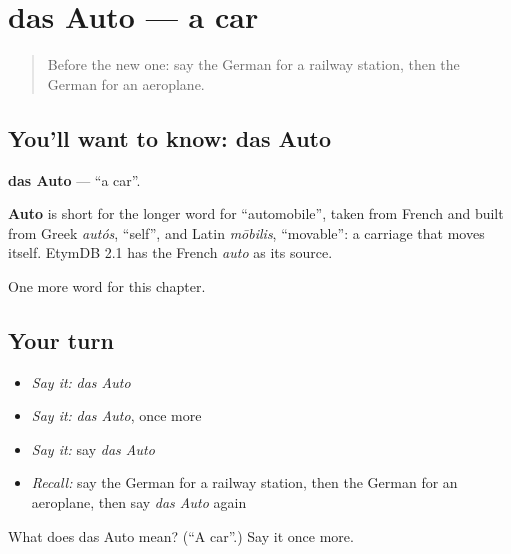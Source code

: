 \section[das Auto]{das Auto — a car}

\label{lesson:GE-C96-auto}



\begin{quote}
Before the new one: say the German for a railway station, then the German for an aeroplane.
\end{quote}

\subsection*{You'll want to know: das Auto}
\textbf{das Auto} — \textquotedblleft{}a car\textquotedblright{}.

\begin{cousinweb}
\textbf{Auto} is short for the longer word for \textquotedblleft{}automobile\textquotedblright{}, taken from French and built from Greek \emph{autós}, \textquotedblleft{}self\textquotedblright{}, and Latin \emph{mōbilis}, \textquotedblleft{}movable\textquotedblright{}: a carriage that moves itself. EtymDB 2.1 has the French \emph{auto} as its source.
\end{cousinweb}

\begin{grammarlens}[title={What you've built}]
One more word for this chapter.
\end{grammarlens}

\subsection*{Your turn}
\begin{itemize}
\raggedright
  \item \emph{Say it:} \emph{das Auto}
  \item \emph{Say it:} \emph{das Auto}, once more
  \item \emph{Say it:} say \emph{das Auto}
  \item \emph{Recall:} say the German for a railway station, then the German for an aeroplane, then say \emph{das Auto} again
\end{itemize}

\begin{tcolorbox}[breakable,colback=teal!4,colframe=teal!35!black,title={Before you move on}]
What does das Auto mean? (\textquotedblleft{}A car\textquotedblright{}.) Say it once more.
\end{tcolorbox}
